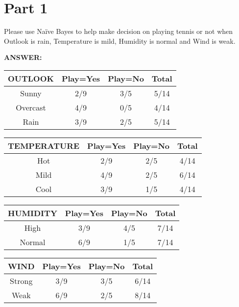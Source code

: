 \documentclass{report}
\begin{document}
\section{Part 1}

Please use	Naïve	Bayes	to	help	make	decision	on	playing	tennis	or	not	when
Outlook	is	rain,	Temperature	is	mild,	Humidity	is	normal and	Wind	is	weak.

\hspace{1cm}

\textbf{ANSWER:} \\

\begin{tabular}{ |c|c|c|c| }
  \hline
  \textbf{OUTLOOK} & Play=Yes & Play=No & Total \\
  \hline
  Sunny            & 2/9      & 3/5     & 5/14  \\
  \hline
  Overcast         & 4/9      & 0/5     & 4/14  \\
  \hline
  Rain             & 3/9      & 2/5     & 5/14  \\
  \hline
\end{tabular}

\vspace*{1 cm}

\begin{tabular}{ |c|c|c|c| }
  \hline
  \textbf{TEMPERATURE} & Play=Yes & Play=No & Total \\
  \hline
  Hot                  & 2/9      & 2/5     & 4/14  \\
  \hline
  Mild                 & 4/9      & 2/5     & 6/14  \\
  \hline
  Cool                 & 3/9      & 1/5     & 4/14  \\
  \hline
\end{tabular}

\vspace*{1 cm}

\begin{tabular}{ |c|c|c|c| }
  \hline
  \textbf{HUMIDITY} & Play=Yes & Play=No & Total \\
  \hline
  High              & 3/9      & 4/5     & 7/14  \\
  \hline
  Normal            & 6/9      & 1/5     & 7/14  \\
  \hline
\end{tabular}

\vspace*{1 cm}

\begin{tabular}{ |c|c|c|c| }
  \hline
  \textbf{WIND} & Play=Yes & Play=No & Total \\
  \hline
  Strong        & 3/9      & 3/5     & 6/14  \\
  \hline
  Weak          & 6/9      & 2/5     & 8/14  \\
  \hline
\end{tabular}
\end{document}
